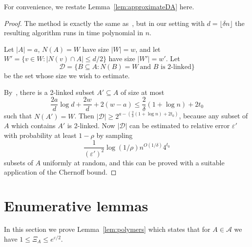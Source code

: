 \documentclass[11pt,letterpaper]{amsart}
\theoremstyle{definition}
\newcommand{\eps}{\varepsilon}
\renewcommand{\subset}{\subseteq}
\begin{document}
For convenience, we restate Lemma~\ref{lem:approximateDA} here.
\lemapproximateDA*

\begin{proof}
    The method is exactly the same as~\cite[Lem.~17]{JPP22}, but in our setting with $d=\lfloor\delta n\rfloor$ the resulting algorithm runs in time polynomial in $n$.
    
    Let $|A|=a$, $N(A)=W$ have size $|W|=w$, and let $W'=\{v\in W : |N(v)\cap A|\le d/2\}$ have size $|W'|=w'$. 
    Let 
    \[ \mathcal D = \{ B\subset A : N(B)=W~\text{and $B$ is 2-linked}\} \]
    be the set whose size we wish to estimate. 

    By~\cite[Cor.~10]{JPP22}, there is a 2-linked subset $A'\subset A$ of size at most 
    \[ \frac{2a}{d}\log d + \frac{2w}{d} + 2(w-a) \le \frac{2}{\delta}\left(1 + \log n\right) + 2t_0 \]
    such that $N(A')=W$. 
    Then $|\mathcal D| \ge 2^{a-\left(\frac{2}{\delta}\left(1 + \log n\right)+2t_0\right)}$, because any subset of $A$ which contains $A'$ is 2-linked. 
    Now $|\mathcal D|$ can be estimated to relative error $\eps'$ with probability at least $1-\rho$ by sampling 
    \[ \frac{1}{(\eps')^2}\log(1/\rho) n^{O(1/\delta)}4^{t_0} \]
    subsets of $A$ uniformly at random, and this can be proved with a suitable application of the Chernoff bound.
\end{proof}

\section{Enumerative lemmas}\label{sec:containers}

In this section we prove Lemma~\ref{lem:polymers} which states that for $A\in\mathcal{A}$ we have $1\le \Xi_A \le e^{\eps/2}$. 
\end{document}
